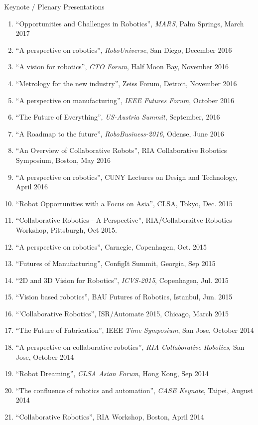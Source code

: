 \documentclass{article}
\begin{document}
\begin{cv}
\begin{cvlist}{Keynote / Plenary Presentations}
\begin{enumerate}
  \item ``Opportunities and Challenges in Robotics'', {\em MARS}, Palm Springs, March 2017
  \item ``A perspective on robotics'', {\em RoboUniverse}, San Diego,  December 2016
  \item ``A vision for robotics'', {\em CTO Forum}, Half Moon Bay, November 2016
  \item ``Metrology for the new industry'', Zeiss Forum, Detroit,  November 2016
  \item ``A perspective on manufacturing'', {\em IEEE Futures Forum},  October 2016
  \item ``The Future of Everything'', {\em US-Austria Summit},  September, 2016
  \item ``A Roadmap to the future'', {\em RoboBusiness-2016}, Odense,  June 2016
  \item ``An Overview of Collaborative Robots'', RIA Collaborative Robotics Symposium, Boston, May 2016
  \item ``A perspective on robotics'', CUNY Lectures on Design and Technology, April 2016
  \item ``Robot Opportunities with a Focus on Asia'', CLSA, Tokyo,  Dec. 2015
  \item ``Collaborative Robotics - A Perspective'', RIA/Collaboraitve Robotics Workshop, Pittsburgh, Oct 2015.
  \item ``A perspective on robotics'', Carnegie, Copenhagen, Oct. 2015
  \item ``Futures of Manufacturing'', ConfigIt Summit, Georgia, Sep 2015
  \item ``2D and 3D Vision for Robotics'', {\em ICVS-2015}, Copenhagen, Jul. 2015
  \item ``Vision based robotics'', BAU Futures of Robotics, Istanbul, Jun. 2015
  \item ``'Collaborative Robotics'', ISR/Automate 2015, Chicago, March 2015
  \item ``The Future of Fabrication'', IEEE {\em Time Symposium}, San Jose, October 2014
  \item ``A perspective on collaborative robotics'', {\em RIA Collaborative Robotics}, San Jose, October 2014
  \item ``Robot Dreaming'', {\em CLSA Asian Forum}, Hong Kong, Sep 2014
  \item ``The confluence of robotics and automation'', {\em CASE Keynote}, Taipei, August 2014
  \item ``Collaborative Robotics'', RIA Workshop, Boston, April 2014

\end{enumerate}
\end{cvlist}
\end{cv}
\end{document}
